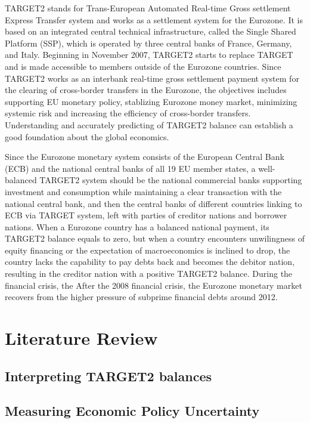 \documentclass[12pt]{article}
\begin{document}
TARGET2 stands for Trans-European Automated Real-time Gross settlement Express Transfer system and works as a settlement system for the Eurozone. It is based on an integrated central technical infrastructure, called the Single Shared Platform (SSP), which is operated by three central banks of France, Germany, and Italy. Beginning in November 2007, TARGET2 starts to replace TARGET and is made accessible to members outside of the Eurozone countries. Since TARGET2 works as an interbank real-time gross settlement payment system for the clearing of cross-border transfers in the Eurozone, the objectives includes supporting EU monetary policy, stablizing Eurozone money market, minimizing systemic risk and increasing the efficiency of cross-border transfers. Understanding and accurately predicting of TARGET2 balance can establish a good foundation about the global economics. 

Since the Eurozone monetary system consists of the European Central Bank (ECB) and the national central banks of all 19 EU member states, a well-balanced TARGET2 system should be the national commercial banks supporting investment and consumption while maintaining a clear transaction with the national central bank, and then the central banks of different countries linking to ECB via TARGET system, left with parties of creditor nations and borrower nations. When a Eurozone country has a balanced national payment, its TARGET2 balance equals to zero, but when a country encounters unwilingness of equity financing or the expectation of macroeconomics is inclined to drop, the country lacks the capability to pay debts back and becomes the debitor nation, resulting in the creditor nation with a positive TARGET2 balance. During the financial crisis, the After the 2008 financial crisis, the Eurozone monetary market recovers from the higher pressure of subprime financial debts around 2012. 


\section{Literature Review} \label{sec:literature}
\subsection{Interpreting TARGET2 balances}


\subsection{Measuring Economic Policy Uncertainty}
\end{document}
